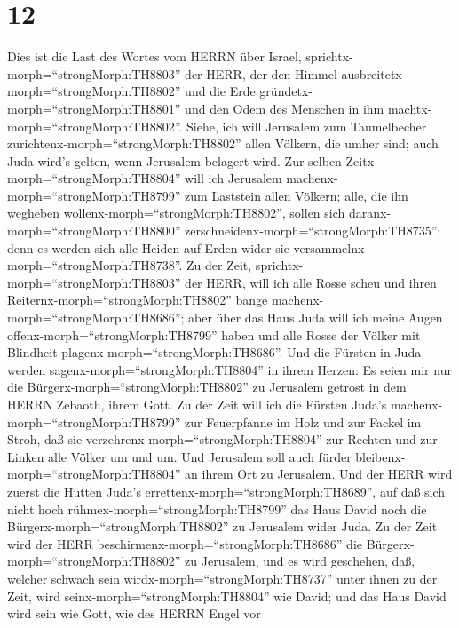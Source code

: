 \hypertarget{section-11}{%
\section{12}\label{section-11}}

 Dies ist die Last des Wortes vom HERRN über Israel,
sprichtx-morph=``strongMorph:TH8803'' der HERR, der den Himmel
ausbreitetx-morph=``strongMorph:TH8802'' und die Erde
gründetx-morph=``strongMorph:TH8801'' und den Odem des Menschen in ihm
machtx-morph=``strongMorph:TH8802''.  Siehe, ich will
Jerusalem zum Taumelbecher zurichtenx-morph=``strongMorph:TH8802'' allen
Völkern, die umher sind; auch Juda wird's gelten, wenn Jerusalem
belagert wird.  Zur selben
Zeitx-morph=``strongMorph:TH8804'' will ich Jerusalem
machenx-morph=``strongMorph:TH8799'' zum Laststein allen Völkern; alle,
die ihn wegheben wollenx-morph=``strongMorph:TH8802'', sollen sich
daranx-morph=``strongMorph:TH8800''
zerschneidenx-morph=``strongMorph:TH8735''; denn es werden sich alle
Heiden auf Erden wider sie versammelnx-morph=``strongMorph:TH8738''.
 Zu der Zeit, sprichtx-morph=``strongMorph:TH8803'' der
HERR, will ich alle Rosse scheu und ihren
Reiternx-morph=``strongMorph:TH8802'' bange
machenx-morph=``strongMorph:TH8686''; aber über das Haus Juda will ich
meine Augen offenx-morph=``strongMorph:TH8799'' haben und alle Rosse der
Völker mit Blindheit plagenx-morph=``strongMorph:TH8686''. 
Und die Fürsten in Juda werden sagenx-morph=``strongMorph:TH8804'' in
ihrem Herzen: Es seien mir nur die Bürgerx-morph=``strongMorph:TH8802''
zu Jerusalem getrost in dem HERRN Zebaoth, ihrem Gott.  Zu
der Zeit will ich die Fürsten Juda's
machenx-morph=``strongMorph:TH8799'' zur Feuerpfanne im Holz und zur
Fackel im Stroh, daß sie verzehrenx-morph=``strongMorph:TH8804'' zur
Rechten und zur Linken alle Völker um und um. Und Jerusalem soll auch
fürder bleibenx-morph=``strongMorph:TH8804'' an ihrem Ort zu Jerusalem.
 Und der HERR wird zuerst die Hütten Juda's
errettenx-morph=``strongMorph:TH8689'', auf daß sich nicht hoch
rühmex-morph=``strongMorph:TH8799'' das Haus David noch die
Bürgerx-morph=``strongMorph:TH8802'' zu Jerusalem wider Juda.
 Zu der Zeit wird der HERR
beschirmenx-morph=``strongMorph:TH8686'' die
Bürgerx-morph=``strongMorph:TH8802'' zu Jerusalem, und es wird
geschehen, daß, welcher schwach sein wirdx-morph=``strongMorph:TH8737''
unter ihnen zu der Zeit, wird seinx-morph=``strongMorph:TH8804'' wie
David; und das Haus David wird sein wie Gott, wie des HERRN Engel vor
